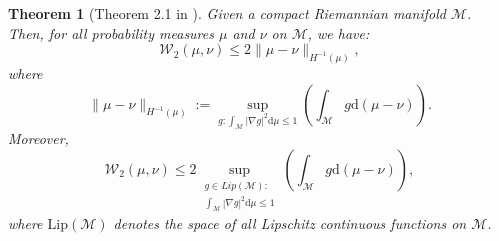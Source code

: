 \documentclass[10pt,a4paper]{article}
\newcommand\cM{\mathcal{M}}
\newcommand\cW{\mathcal{W}}
\newcommand\dd{\mathrm{d}}
\newcommand{\PAR}[1]{{{\left(#1\right)}}} %
\newtheorem{theorem}{Theorem}[section]
\begin{document}
\begin{theorem}[Theorem 2.1 in \cite{peyre2018comparison}]\label{theorem:peyre_appendix}
    Given a compact Riemannian manifold $\cM$.
    Then, for all probability measures $\mu$ and $\nu$ on $\cM$, we have:
    $$
        \cW_2(\mu,\nu) \le 2\| \mu-\nu\|_{H^{-1}(\mu)},
    $$
    where
    $$
        \| \mu-\nu\|_{H^{-1}(\mu)}:= \sup_{g:  \int_\cM | \nabla g|^2 \dd \mu \le 1} \PAR{ \int_\cM g\dd (\mu-\nu)}.
    $$
    Moreover,
    \begin{equation*}
        \cW_2(\mu,\nu) \le 2\sup_{\substack{g \in Lip(\cM): \\ \int_\cM | \nabla g|^2 \dd \mu \le 1}} \PAR{ \int_\cM g\dd (\mu-\nu)},
    \end{equation*}
    where $\text{Lip}(\cM)$ denotes the space of all Lipschitz continuous functions on $\cM$.
\end{theorem}
\end{document}
